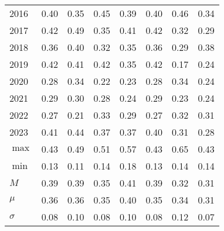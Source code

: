 \documentclass{article}
\begin{document}
\begin{table}[!ht]
\begin{tabular}{l| ccc||cc||cc}
        2016 & 0.40 & 0.35 & 0.45 & 0.39 & \cellcolor{green!25}0.40 & \cellcolor{green!25}0.46 & 0.34 \\ 
        2017 & 0.42 & 0.49 & 0.35 & 0.41 & \cellcolor{green!25}0.42 & \cellcolor{green!25}0.32 & 0.29 \\ 
        2018 & 0.36 & 0.40 & 0.32 & 0.35 & \cellcolor{green!25}0.36 & 0.29 & \cellcolor{green!25}0.38 \\ 
        2019 & 0.42 & 0.41 & 0.42 & 0.35 & \cellcolor{green!25}0.42 & 0.17 & \cellcolor{green!25}0.24 \\ 
        2020 & 0.28 & 0.34 & 0.22 & 0.23 & \cellcolor{green!25}0.28 & \cellcolor{green!25}0.34 & 0.24 \\ 
        2021 & 0.29 & 0.30 & 0.28 & 0.24 & \cellcolor{green!25}0.29 & 0.23 & \cellcolor{green!25}0.24 \\ 
        2022 & 0.27 & 0.21 & 0.33 & \cellcolor{green!25}0.29 & 0.27 & \cellcolor{green!25}0.32 & 0.31 \\ 
        2023 & 0.41 & 0.44 & 0.37 & 0.37 & \cellcolor{green!25}0.40 & \cellcolor{green!25}0.31 & 0.28 \\ \hline
        $\max$ & 0.43 & 0.49 & 0.51 & \cellcolor{green!25}0.57 & 0.43 & \cellcolor{green!25}0.65 & 0.43 \\ 
        $\min$ & 0.13 & 0.11 & 0.14 & \cellcolor{green!25}0.18 & 0.13 & \cellcolor{green!25}0.14 & 0.14 \\ 
        $M$ & 0.39 & 0.39 & 0.35 & \cellcolor{green!25}0.41 & 0.39 & \cellcolor{green!25}0.32 & 0.31 \\ 
        $\mu$  & 0.36 & 0.36 & 0.35 & \cellcolor{green!25}0.40 & 0.35 & \cellcolor{green!25}0.34 & 0.31 \\ 
        $\sigma$ & 0.08 & 0.10 & 0.08 & \cellcolor{green!25}0.10 & 0.08 & \cellcolor{green!25}0.12 & 0.07 \\    \hline
    \end{tabular}
    \label{tab:return_effiency_ratios}
\end{table}






\newpage
\end{document}
